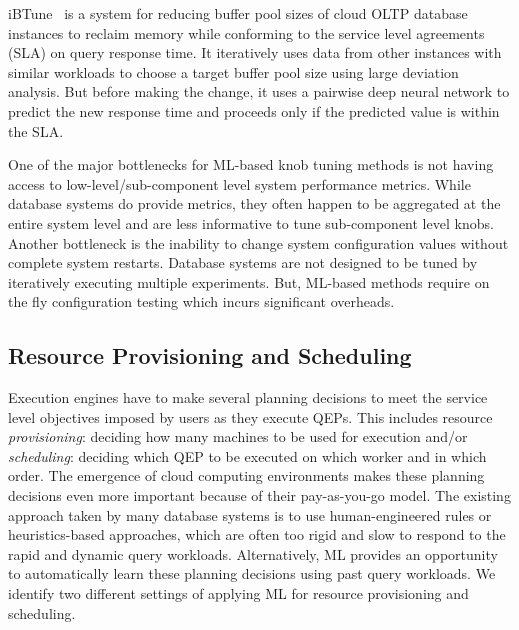 iBTune~\cite{ibtune} is a system for reducing buffer pool sizes of cloud OLTP database instances to reclaim memory while conforming to the service level agreements (SLA) on query response time.
It iteratively uses data from other instances with similar workloads to choose a target buffer pool size using large deviation analysis.
But before making the change, it uses a pairwise deep neural network to predict the new response time and proceeds only if the predicted value is within the SLA.

One of the major bottlenecks for ML-based knob tuning methods is not having access to low-level/sub-component level system performance metrics.
While database systems do provide metrics, they often happen to be aggregated at the entire system level and are less informative to tune sub-component level knobs.
Another bottleneck is the inability to change system configuration values without complete system restarts.
Database systems are not designed to be tuned by iteratively executing multiple experiments. 
But, ML-based methods require on the fly configuration testing which incurs significant overheads.

\subsection{Resource Provisioning and Scheduling}
Execution engines have to make several planning decisions to meet the service level objectives imposed by users as they execute QEPs.
This includes resource \textit{provisioning}: deciding how many machines to be used for execution and/or \textit{scheduling}: deciding which QEP to be executed on which worker and in which order.
The emergence of cloud computing environments makes these planning decisions even more important because of their pay-as-you-go model.
The existing approach taken by many database systems is to use human-engineered rules or heuristics-based approaches, which are often too rigid and slow to respond to the rapid and dynamic query workloads.
Alternatively, ML provides an opportunity to automatically learn these planning decisions using past query workloads.
We identify two different settings of applying ML for resource provisioning and scheduling.

